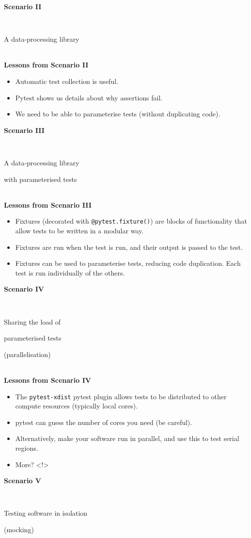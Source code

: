 \documentclass[12pt]{article}
\newlength{\geometrytop}
\newcommand{\slidetitle}[1]{~\\[-0.5ex]{\Large\bf{\color{bold}#1}}\\}
\begin{document}
\thispagestyle{plain}
\vspace*{-\topskip}
\vspace*{\fill}
{\Huge\centerline{\textbf{Scenario II}}~\newline
\centerline{A data-processing library}}
\vspace*{\fill}
\vspace*{\geometrytop}
\clearpage

\slidetitle{Lessons from Scenario II}
\begin{itemize}
\item Automatic test collection is useful.
\item Pytest shows us details about why assertions fail.
\item We need to be able to parameterise tests (without duplicating code).
\end{itemize}
\clearpage

\thispagestyle{plain}
\vspace*{-\topskip}
\vspace*{\fill}
{\Huge\centerline{\textbf{Scenario III}}~\newline
\centerline{A data-processing library}
\centerline{with parameterised tests}}
\vspace*{\fill}
\vspace*{\geometrytop}
\clearpage

\slidetitle{Lessons from Scenario III}
\begin{itemize}
\item Fixtures (decorated with \verb|@pytest.fixture()|) are blocks of
    functionality that allow tests to be written in a modular way.
\item Fixtures are run when the test is run, and their output is passed to the
    test.
\item Fixtures can be used to parameterise tests, reducing code
    duplication. Each test is run individually of the others.
\end{itemize}
\clearpage

\thispagestyle{plain}
\vspace*{-\topskip}
\vspace*{\fill}
{\Huge\centerline{\textbf{Scenario IV}}~\newline
\centerline{Sharing the load of}
\centerline{parameterised tests}
\centerline{(parallelisation)}}
\vspace*{\fill}
\vspace*{\geometrytop}
\clearpage

\slidetitle{Lessons from Scenario IV}
\begin{itemize}
\item The \verb|pytest-xdist| pytest plugin allows tests to be distributed to
    other compute resources (typically local cores).
\item pytest can guess the number of cores you need (be careful).
\item Alternatively, make your software run in parallel, and use this to test
    serial regions.
\item More? <!>
\end{itemize}
\clearpage

\thispagestyle{plain}
\vspace*{-\topskip}
\vspace*{\fill}
{\Huge\centerline{\textbf{Scenario V}}~\newline
\centerline{Testing software in isolation}
\centerline{(mocking)}}
\vspace*{\fill}
\vspace*{\geometrytop}
\clearpage
\end{document}
